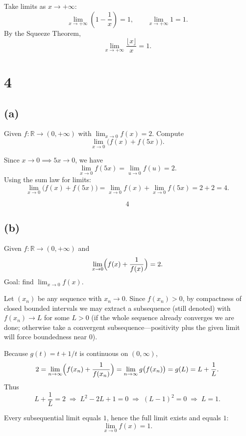\documentclass[12pt,a4paper]{article}
\theoremstyle{definition}
\theoremstyle{remark}
\begin{document}
Take limits as \(x\to +\infty\):
\[
\lim_{x\to +\infty}\left(1-\frac{1}{x}\right)=1,
\qquad
\lim_{x\to +\infty} 1 = 1.
\]
By the Squeeze Theorem,
\[
\boxed{\lim_{x\to +\infty}\frac{\lfloor x\rfloor}{x}=1 }.
\]



\section*{4}
\subsection*{(a)}
Given $f:\mathbb{R}\to(0,+\infty)$ with $\displaystyle\lim_{x\to 0} f(x)=2$. Compute
\[
\lim_{x\to 0}\bigl(f(x)+f(5x)\bigr).
\]

Since $x\to 0 \implies 5x\to 0$, we have
\[
\lim_{x\to 0} f(5x)=\lim_{u\to 0} f(u)=2.
\]
Using the sum law for limits:
\[
\lim_{x\to 0}\bigl(f(x)+f(5x)\bigr)=\lim_{x\to 0} f(x)+\lim_{x\to 0} f(5x)=2+2=4.
\]

\[
\boxed{4}
\]




\subsection*{(b)}
Given $f:\mathbb{R}\to(0,+\infty)$ and
\[
\lim_{x\to 0}\Bigl(f(x)+\frac{1}{f(x)}\Bigr)=2.
\]
Goal: find $\displaystyle \lim_{x\to 0} f(x)$.

Let $(x_n)$ be any sequence with $x_n\to 0$. Since $f(x_n)>0$, by compactness of closed bounded intervals we may extract a subsequence (still denoted) with $f(x_n)\to L$ for some $L>0$ (if the whole sequence already converges we are done; otherwise take a convergent subsequence—positivity plus the given limit will force boundedness near 0).

Because $g(t)=t+1/t$ is continuous on $(0,\infty)$,
\[
2=\lim_{n\to\infty} \Bigl(f(x_n)+\frac{1}{f(x_n)}\Bigr)=\lim_{n\to\infty} g\bigl(f(x_n)\bigr)=g(L)=L+\frac{1}{L}.
\]
Thus
\[
L+\frac{1}{L}=2 \;\Longrightarrow\; L^2-2L+1=0 \;\Longrightarrow\; (L-1)^2=0 \;\Longrightarrow\; L=1.
\]

Every subsequential limit equals $1$, hence the full limit exists and equals $1$:
\[
\boxed{\lim_{x\to 0} f(x)=1}.
\]
\end{document}
